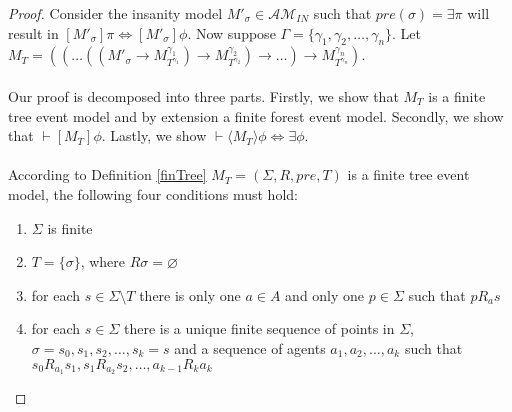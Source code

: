 \documentclass[12pt, a4paper, titlepage]{scrartcl}
\numberwithin{equation}{section}
\newcommand{\eventClass}{\mathcal{AM}}
\newcommand{\insaneClass}{\eventClass_{IN}}
\begin{document}
\begin{proof}
Consider the insanity model $M'_\sigma \in \insaneClass$ such that $pre(\sigma) =
\exists \pi$ will result in $[M'_\sigma] \pi \iff [M'_\sigma] \phi$.
Now suppose $\Gamma = \{ \gamma_1, \gamma_2, \ldots, \gamma_n \}$.
Let $M_T = ((\ldots((M'_\sigma \to M^{\gamma_1}_{T^{\gamma_1}}) \to
			M^{\gamma_2}_{T^{\gamma_2}}) \to \ldots ) \to M^{\gamma_n}_{T^{\gamma_n}} )$.\\
\\
Our proof is decomposed into three parts.
Firstly, we show that $M_T$ is a finite tree event model and by extension a finite forest event
model.
Secondly, we show that $\vdash [M_T] \phi$.
Lastly, we show $\vdash \langle M_T \rangle \phi \iff \exists \phi$.\\
\\
According to Definition \ref{finTree} $M_T = (\Sigma, R, pre, T)$ is a finite tree event model, the following four conditions must hold:
\begin{enumerate}
	\item $\Sigma$ is finite \label{treeConFinite}
	\item $T = \{\sigma\}$, where $R \sigma = \varnothing$ \label{treeConRoot}
	\item for each $s \in \Sigma \setminus T$ there is only one $a \in A$ and only one $p \in \Sigma$
	such that $p R_a s$ \label{treeConOneAgent}
	\item for each $s \in \Sigma$ there is a unique finite sequence of points in $\Sigma$, $\sigma =
	s_0, s_1, s_2, \ldots, s_k = s$ and a sequence of agents $a_1, a_2, \ldots, a_k$ such that $s_0
	R_{a_1} s_1, s_1 R_{a_2} s_2, \ldots, a_{k-1} R_k
	a_k$ \label{treeConUniquePath}
\end{enumerate}


\end{proof}
\end{document}
